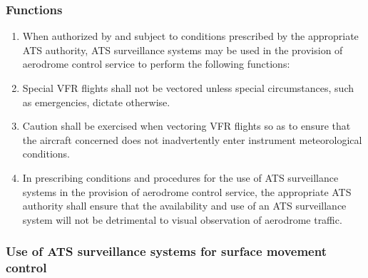 \subsubsection{Functions}

\begin{enumerate}
    \item When authorized by and subject to conditions prescribed by the appropriate ATS authority, ATS surveillance systems may be used in the provision of aerodrome control service to perform the following functions:
    

    \item Special VFR flights shall not be vectored unless special circumstances, such as emergencies, dictate otherwise.
    \item Caution shall be exercised when vectoring VFR flights so as to ensure that the aircraft concerned does not inadvertently enter instrument meteorological conditions.
    \item In prescribing conditions and procedures for the use of ATS surveillance systems in the provision of aerodrome control service, the appropriate ATS authority shall ensure that the availability and use of an ATS surveillance system will not be detrimental to visual observation of aerodrome traffic.
\end{enumerate}

\subsubsection{Use of ATS surveillance systems for surface movement control}



